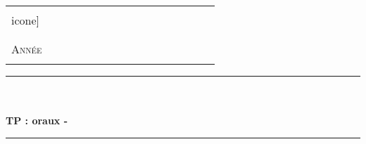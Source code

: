 %
%



  \begin{center} %


	\begin{center}
		\begin{tabular}{p{0.2\linewidth}p{0.6\linewidth}}
			\begin{minipage}{\linewidth}
				\begin{center}
					\texttt{[image: \\icone]}\\[0.5cm]
				\end{center}
			\end{minipage}
		&

			\begin{minipage}{\linewidth}
				\begin{center}
					\textsc{\LARGE \etablissement}\\[1cm]
    
					\textsc{\Large \classe}\\[0.5cm]

					\textsc{\Large Année \annee}\\[1cm]
				\end{center}
			\end{minipage}
		\end{tabular}
	\end{center}
	\vspace{0.6cm}

    
    \rule{\linewidth}{0.5mm}\\[0.4cm]

    {\textsc{\partie}}\\[0.4cm]

    { \huge \bfseries TP : oraux - \titre }\\[0.4cm]

    \rule{\linewidth}{0.5mm}\\[1cm]


  \end{center}	%



